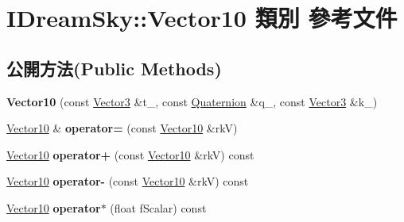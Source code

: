 \hypertarget{class_i_dream_sky_1_1_vector10}{}\section{I\+Dream\+Sky\+:\+:Vector10 類別 參考文件}
\label{class_i_dream_sky_1_1_vector10}
\subsection*{公開方法(Public Methods)}
\begin{DoxyCompactItemize}
\item 
{\bfseries Vector10} (const \hyperlink{class_i_dream_sky_1_1_vector3}{Vector3} \&t\+\_\+, const \hyperlink{class_i_dream_sky_1_1_quaternion}{Quaternion} \&q\+\_\+, const \hyperlink{class_i_dream_sky_1_1_vector3}{Vector3} \&k\+\_\+)\hypertarget{class_i_dream_sky_1_1_vector10_ac95d26a1a398b5ecfd646a41b39893dc}{}\label{class_i_dream_sky_1_1_vector10_ac95d26a1a398b5ecfd646a41b39893dc}

\item 
\hyperlink{class_i_dream_sky_1_1_vector10}{Vector10} \& {\bfseries operator=} (const \hyperlink{class_i_dream_sky_1_1_vector10}{Vector10} \&rkV)\hypertarget{class_i_dream_sky_1_1_vector10_af006b5d5f0559cd7199647600eaa1e76}{}\label{class_i_dream_sky_1_1_vector10_af006b5d5f0559cd7199647600eaa1e76}

\item 
\hyperlink{class_i_dream_sky_1_1_vector10}{Vector10} {\bfseries operator+} (const \hyperlink{class_i_dream_sky_1_1_vector10}{Vector10} \&rkV) const \hypertarget{class_i_dream_sky_1_1_vector10_a449127793f71643d03fde0bf5a06f1f2}{}\label{class_i_dream_sky_1_1_vector10_a449127793f71643d03fde0bf5a06f1f2}

\item 
\hyperlink{class_i_dream_sky_1_1_vector10}{Vector10} {\bfseries operator-\/} (const \hyperlink{class_i_dream_sky_1_1_vector10}{Vector10} \&rkV) const \hypertarget{class_i_dream_sky_1_1_vector10_af1dce227feb50bc97067f0697cd71e0b}{}\label{class_i_dream_sky_1_1_vector10_af1dce227feb50bc97067f0697cd71e0b}

\item 
\hyperlink{class_i_dream_sky_1_1_vector10}{Vector10} {\bfseries operator$\ast$} (float f\+Scalar) const \hypertarget{class_i_dream_sky_1_1_vector10_a2fea9658340acd882d82536b8711b08f}{}\label{class_i_dream_sky_1_1_vector10_a2fea9658340acd882d82536b8711b08f}


\end{DoxyCompactItemize}
